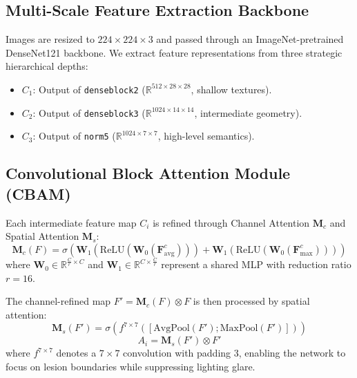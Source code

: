 \documentclass[conference]{IEEEtran}
\begin{document}
\subsection{Multi-Scale Feature Extraction Backbone}
Images are resized to $224 \times 224 \times 3$ and passed through an ImageNet-pretrained DenseNet121 backbone. We extract feature representations from three strategic hierarchical depths:
\begin{itemize}
    \item $C_1$: Output of \texttt{denseblock2} ($\mathbb{R}^{512 \times 28 \times 28}$, shallow textures).
    \item $C_2$: Output of \texttt{denseblock3} ($\mathbb{R}^{1024 \times 14 \times 14}$, intermediate geometry).
    \item $C_3$: Output of \texttt{norm5} ($\mathbb{R}^{1024 \times 7 \times 7}$, high-level semantics).
\end{itemize}

\subsection{Convolutional Block Attention Module (CBAM)}
Each intermediate feature map $C_i$ is refined through Channel Attention $\mathbf{M}_c$ and Spatial Attention $\mathbf{M}_s$:
\begin{equation}
\mathbf{M}_c(F) = \sigma\left(\mathbf{W}_1(\text{ReLU}(\mathbf{W}_0(\mathbf{F}_{\text{avg}}^c))) + \mathbf{W}_1(\text{ReLU}(\mathbf{W}_0(\mathbf{F}_{\text{max}}^c)))\right)
\end{equation}
where $\mathbf{W}_0 \in \mathbb{R}^{\frac{C}{r} \times C}$ and $\mathbf{W}_1 \in \mathbb{R}^{C \times \frac{C}{r}}$ represent a shared MLP with reduction ratio $r=16$.

The channel-refined map $F' = \mathbf{M}_c(F) \otimes F$ is then processed by spatial attention:
\begin{equation}
\mathbf{M}_s(F') = \sigma\left(f^{7 \times 7}\left([\text{AvgPool}(F'); \text{MaxPool}(F')]\right)\right)
\end{equation}
\begin{equation}
A_i = \mathbf{M}_s(F') \otimes F'
\end{equation}
where $f^{7 \times 7}$ denotes a $7 \times 7$ convolution with padding 3, enabling the network to focus on lesion boundaries while suppressing lighting glare.
\end{document}
